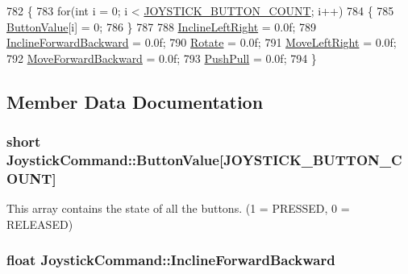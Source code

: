 \begin{DoxyCode}
782     \{
783         \textcolor{keywordflow}{for}(\textcolor{keywordtype}{int} i = 0; i < \hyperlink{KinovaTypes_8h_a3792c81f5808ad4f30000689ee0f0d07}{JOYSTICK\_BUTTON\_COUNT}; i++)
784         \{
785             \hyperlink{structJoystickCommand_abe14f0b7b117048aa1c7f9626a669035}{ButtonValue}[i] = 0;
786         \}
787 
788         \hyperlink{structJoystickCommand_a357b7ffd95720084658487aee12662c8}{InclineLeftRight} = 0.0f;
789         \hyperlink{structJoystickCommand_ac1ac2e83b68ea20eba3e92935b966ba6}{InclineForwardBackward} = 0.0f;
790         \hyperlink{structJoystickCommand_a02fece0bcf6cfc2135f294a3dbe9db4e}{Rotate} = 0.0f;
791         \hyperlink{structJoystickCommand_a6ca311d7940ce3c7ea6e9a3719388181}{MoveLeftRight} = 0.0f;
792         \hyperlink{structJoystickCommand_a9ca8ffe74ba1717de22528f71b0e5592}{MoveForwardBackward} = 0.0f;
793         \hyperlink{structJoystickCommand_af530128a7a89e383f88a4c2b798a66b4}{PushPull} = 0.0f;
794     \}
\end{DoxyCode}


\subsection{Member Data Documentation}
\subsubsection[{\texorpdfstring{Button\+Value}{ButtonValue}}]{\setlength{\rightskip}{0pt plus 5cm}short Joystick\+Command\+::\+Button\+Value\mbox{[}{\bf J\+O\+Y\+S\+T\+I\+C\+K\+\_\+\+B\+U\+T\+T\+O\+N\+\_\+\+C\+O\+U\+NT}\mbox{]}}\hypertarget{structJoystickCommand_abe14f0b7b117048aa1c7f9626a669035}{}\label{structJoystickCommand_abe14f0b7b117048aa1c7f9626a669035}


This array contains the state of all the buttons. (1 = P\+R\+E\+S\+S\+ED, 0 = R\+E\+L\+E\+A\+S\+ED) 

\subsubsection[{\texorpdfstring{Incline\+Forward\+Backward}{InclineForwardBackward}}]{\setlength{\rightskip}{0pt plus 5cm}float Joystick\+Command\+::\+Incline\+Forward\+Backward}\hypertarget{structJoystickCommand_ac1ac2e83b68ea20eba3e92935b966ba6}{}\label{structJoystickCommand_ac1ac2e83b68ea20eba3e92935b966ba6}


